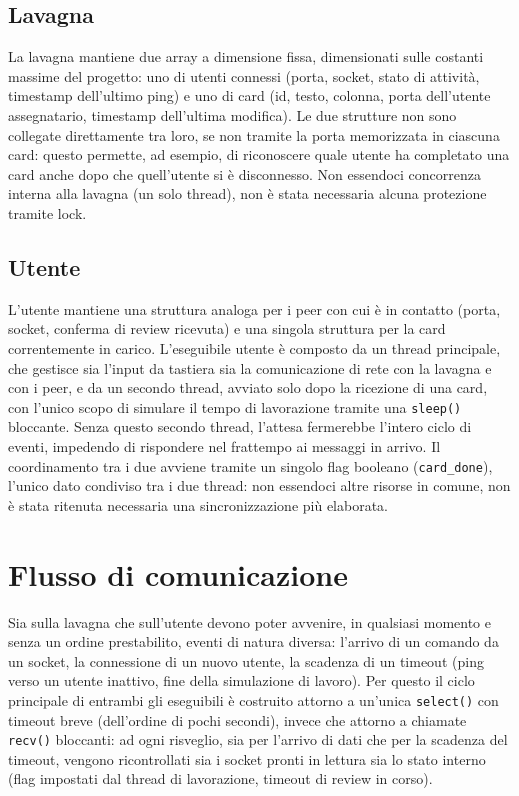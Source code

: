 \documentclass{article}
\begin{document}
\subsection{Lavagna}
La lavagna mantiene due array a dimensione fissa, dimensionati sulle costanti massime del progetto: uno di utenti connessi (porta, socket, stato di attività, timestamp dell'ultimo ping) e uno di card (id, testo, colonna, porta dell'utente assegnatario, timestamp dell'ultima modifica). Le due strutture non sono collegate direttamente tra loro, se non tramite la porta memorizzata in ciascuna card: questo permette, ad esempio, di riconoscere quale utente ha completato una card anche dopo che quell'utente si è disconnesso.
Non essendoci concorrenza interna alla lavagna (un solo thread), non è stata necessaria alcuna protezione tramite lock.
\subsection{Utente}
L'utente mantiene una struttura analoga per i peer con cui è in contatto (porta, socket, conferma di review ricevuta) e una singola struttura per la card correntemente in carico.
L'eseguibile utente è composto da un thread principale, che gestisce sia l'input da tastiera sia la comunicazione di rete con la lavagna e con i peer, e da un secondo thread, avviato solo dopo la ricezione di una card, con l'unico scopo di simulare il tempo di lavorazione tramite una \verb|sleep()| bloccante. Senza questo secondo thread, l'attesa fermerebbe l'intero ciclo di eventi, impedendo di rispondere nel frattempo ai messaggi in arrivo. Il coordinamento tra i due avviene tramite un singolo flag booleano (\verb|card_done|), l'unico dato condiviso tra i due thread: non essendoci altre risorse in comune, non è stata ritenuta necessaria una sincronizzazione più elaborata.

\section{Flusso di comunicazione}
Sia sulla lavagna che sull'utente devono poter avvenire, in qualsiasi momento e senza un ordine prestabilito, eventi di natura diversa: l'arrivo di un comando da un socket, la connessione di un nuovo utente, la scadenza di un timeout (ping verso un utente inattivo, fine della simulazione di lavoro). Per questo il ciclo principale di entrambi gli eseguibili è costruito attorno a un'unica \verb|select()| con timeout breve (dell'ordine di pochi secondi), invece che attorno a chiamate \verb|recv()| bloccanti: ad ogni risveglio, sia per l'arrivo di dati che per la scadenza del timeout, vengono ricontrollati sia i socket pronti in lettura sia lo stato interno (flag impostati dal thread di lavorazione, timeout di review in corso).
\end{document}
